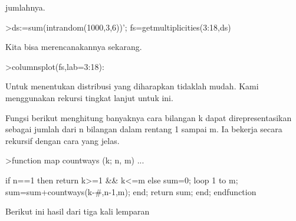 \documentclass[a4paper,10pt]{article}
\begin{document}
\begin{eulernotebook}
\begin{eulercomment}
\begin{eulercomment}
\begin{eulercomment}
\begin{eulercomment}
\begin{eulercomment}
\begin{eulercomment}
\begin{eulercomment}
\begin{eulercomment}
\begin{eulercomment}
\begin{eulercomment}
\begin{eulercomment}
\begin{eulercomment}
\begin{eulercomment}
\begin{eulercomment}
\begin{eulercomment}
\begin{eulercomment}
\begin{eulercomment}
\begin{eulercomment}
\begin{eulercomment}
\begin{eulercomment}
\begin{eulercomment}
\begin{eulercomment}
\begin{eulercomment}
\begin{eulercomment}
\begin{eulercomment}
\begin{eulercomment}
\begin{eulercomment}
\begin{eulercomment}
\begin{eulercomment}
\begin{eulercomment}
\begin{eulercomment}
\begin{eulercomment}
\begin{eulercomment}
\begin{eulercomment}
\begin{eulercomment}
\begin{eulercomment}
\begin{eulercomment}
\begin{eulercomment}
\begin{eulercomment}
\begin{eulercomment}
\begin{eulercomment}
\begin{eulercomment}
\begin{eulercomment}
\begin{eulercomment}
\begin{eulercomment}
\begin{eulercomment}
\begin{eulercomment}
\begin{eulercomment}
\begin{eulercomment}
\begin{eulercomment}
\begin{eulercomment}
\begin{eulercomment}
\begin{eulercomment}
\begin{eulercomment}
\begin{eulercomment}
\begin{eulercomment}
\begin{eulercomment}
\begin{eulercomment}
\begin{eulercomment}
\begin{eulercomment}
\begin{eulercomment}
\begin{eulercomment}
\begin{eulercomment}
\begin{eulercomment}
\begin{eulercomment}
\begin{eulercomment}
\begin{eulercomment}
jumlahnya.
\end{eulercomment}
\begin{eulerprompt}
>ds:=sum(intrandom(1000,3,6))';  fs=getmultiplicities(3:18,ds)
\end{eulerprompt}
\begin{euleroutput}
  [4,  17,  25,  40,  52,  85,  118,  145,  130,  124,  110,  70,  39,
  24,  14,  3]
\end{euleroutput}
\begin{eulercomment}
Kita bisa merencanakannya sekarang.
\end{eulercomment}
\begin{eulerprompt}
>columnsplot(fs,lab=3:18):
\end{eulerprompt}
\begin{eulercomment}
Untuk menentukan distribusi yang diharapkan tidaklah mudah. Kami
menggunakan rekursi tingkat lanjut untuk ini.

Fungsi berikut menghitung banyaknya cara bilangan k dapat
direpresentasikan sebagai jumlah dari n bilangan dalam rentang 1
sampai m. Ia bekerja secara rekursif dengan cara yang jelas.
\end{eulercomment}
\begin{eulerprompt}
>function map countways (k; n, m) ...
\end{eulerprompt}
\begin{eulerudf}
    if n==1 then return k>=1 && k<=m
    else
      sum=0; 
      loop 1 to m; sum=sum+countways(k-#,n-1,m); end;
      return sum;
    end;
  endfunction
\end{eulerudf}
\begin{eulercomment}
Berikut ini hasil dari tiga kali lemparan 
\end{eulercomment}
\end{eulercomment}
\end{eulercomment}
\end{eulercomment}
\end{eulercomment}
\end{eulercomment}
\end{eulercomment}
\end{eulercomment}
\end{eulercomment}
\end{eulercomment}
\end{eulercomment}
\end{eulercomment}
\end{eulercomment}
\end{eulercomment}
\end{eulercomment}
\end{eulercomment}
\end{eulercomment}
\end{eulercomment}
\end{eulercomment}
\end{eulercomment}
\end{eulercomment}
\end{eulercomment}
\end{eulercomment}
\end{eulercomment}
\end{eulercomment}
\end{eulercomment}
\end{eulercomment}
\end{eulercomment}
\end{eulercomment}
\end{eulercomment}
\end{eulercomment}
\end{eulercomment}
\end{eulercomment}
\end{eulercomment}
\end{eulercomment}
\end{eulercomment}
\end{eulercomment}
\end{eulercomment}
\end{eulercomment}
\end{eulercomment}
\end{eulercomment}
\end{eulercomment}
\end{eulercomment}
\end{eulercomment}
\end{eulercomment}
\end{eulercomment}
\end{eulercomment}
\end{eulercomment}
\end{eulercomment}
\end{eulercomment}
\end{eulercomment}
\end{eulercomment}
\end{eulercomment}
\end{eulercomment}
\end{eulercomment}
\end{eulercomment}
\end{eulercomment}
\end{eulercomment}
\end{eulercomment}
\end{eulercomment}
\end{eulercomment}
\end{eulercomment}
\end{eulercomment}
\end{eulercomment}
\end{eulercomment}
\end{eulercomment}
\end{eulercomment}
\end{eulernotebook}
\end{document}
